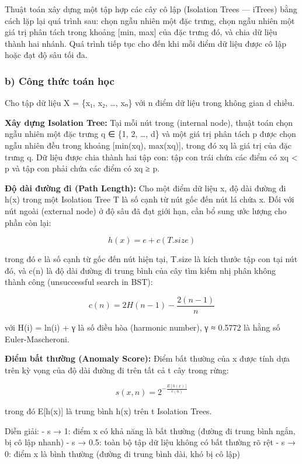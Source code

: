 \documentclass[
  a4paper]{report}
\begin{document}
Thuật toán xây dựng một tập hợp các cây cô lập (Isolation Trees ---
iTrees) bằng cách lặp lại quá trình sau: chọn ngẫu nhiên một đặc trưng,
chọn ngẫu nhiên một giá trị phân tách trong khoảng {[}min, max{]} của
đặc trưng đó, và chia dữ liệu thành hai nhánh. Quá trình tiếp tục cho
đến khi mỗi điểm dữ liệu được cô lập hoặc đạt độ sâu tối đa.

\subsubsection{b) Công thức toán
học}\label{b-cuxf4ng-thux1ee9c-touxe1n-hux1ecdc}

Cho tập dữ liệu X = \{x₁, x₂, \ldots, xₙ\} với n điểm dữ liệu trong
không gian d chiều.

\textbf{Xây dựng Isolation Tree:} Tại mỗi nút trong (internal node),
thuật toán chọn ngẫu nhiên một đặc trưng q ∈ \{1, 2, \ldots, d\} và một
giá trị phân tách p được chọn ngẫu nhiên đều trong khoảng {[}min(xq),
max(xq){]}, trong đó xq là giá trị của đặc trưng q. Dữ liệu được chia
thành hai tập con: tập con trái chứa các điểm có xq \textless{} p và tập
con phải chứa các điểm có xq ≥ p.

\textbf{Độ dài đường đi (Path Length):} Cho một điểm dữ liệu x, độ dài
đường đi h(x) trong một Isolation Tree T là số cạnh từ nút gốc đến nút
lá chứa x. Đối với nút ngoài (external node) ở độ sâu đã đạt giới hạn,
cần bổ sung ước lượng cho phần còn lại:

\[h(x) = e + c(T.size)\]

trong đó e là số cạnh từ gốc đến nút hiện tại, T.size là kích thước tập
con tại nút đó, và c(n) là độ dài đường đi trung bình của cây tìm kiếm
nhị phân không thành công (unsuccessful search in BST):

\[c(n) = 2H(n-1) - \frac{2(n-1)}{n}\]

với H(i) = ln(i) + γ là số điều hòa (harmonic number), γ ≈ 0.5772 là
hằng số Euler-Mascheroni.

\textbf{Điểm bất thường (Anomaly Score):} Điểm bất thường của x được
tính dựa trên kỳ vọng của độ dài đường đi trên tất cả t cây trong rừng:

\[s(x, n) = 2^{-\frac{E[h(x)]}{c(n)}}\]

trong đó E{[}h(x){]} là trung bình h(x) trên t Isolation Trees.

Diễn giải: - s → 1: điểm x có khả năng là bất thường (đường đi trung
bình ngắn, bị cô lập nhanh) - s → 0.5: toàn bộ tập dữ liệu không có bất
thường rõ rệt - s → 0: điểm x là bình thường (đường đi trung bình dài,
khó bị cô lập)
\end{document}

